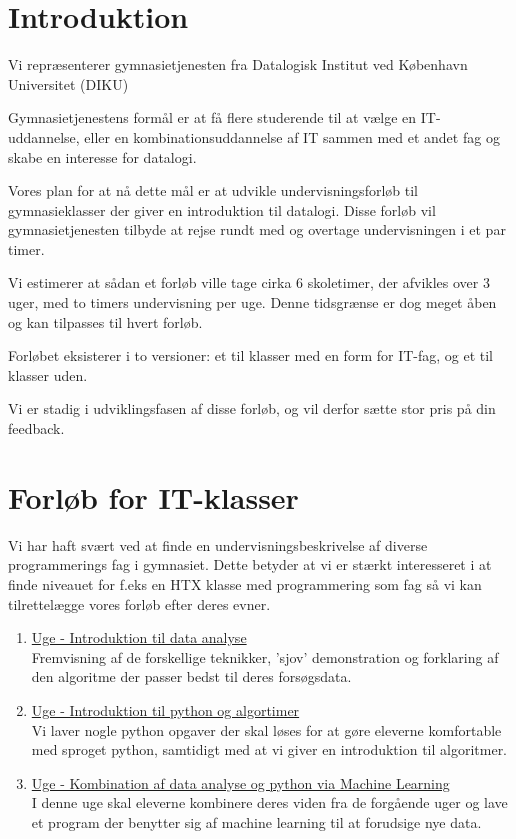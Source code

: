 \documentclass[11pt]{article}
\begin{document}
    \newpage                %
    \setcounter{page}{1}    %
\section{Introduktion}
    Vi repræsenterer gymnasietjenesten fra
    Datalogisk Institut ved København Universitet (DIKU)

    Gymnasietjenestens formål er at få flere studerende til at vælge en
    IT-uddannelse, eller en kombinationsuddannelse af IT sammen med et andet fag
    og skabe en interesse for datalogi.

    Vores plan for at nå dette mål er at udvikle undervisningsforløb til
    gymnasieklasser der giver en introduktion til datalogi. Disse forløb vil
    gymnasietjenesten tilbyde at rejse rundt med og overtage undervisningen i et
    par timer.

    Vi estimerer at sådan et forløb ville tage cirka 6 skoletimer, der afvikles
    over 3 uger, med to timers undervisning per uge. Denne tidsgrænse er dog
    meget åben og kan tilpasses til hvert forløb.

    Forløbet eksisterer i to versioner: et til klasser med en form for IT-fag,
    og et til klasser uden.

    Vi er stadig i udviklingsfasen af disse forløb, og vil derfor sætte stor
    pris på din feedback.

\section{Forløb for IT-klasser}
    Vi har haft svært ved at finde en undervisningsbeskrivelse af diverse
    programmerings fag i gymnasiet. Dette betyder at vi er stærkt interesseret i
    at finde niveauet for f.eks en HTX klasse med programmering som fag så vi
    kan tilrettelægge vores forløb efter deres evner.
    \begin{enumerate}
        \item \underline{Uge - Introduktion til data analyse} ~ \\
        Fremvisning af de forskellige teknikker, 'sjov' demonstration og
        forklaring af den algoritme der passer bedst til deres forsøgsdata.

        \item \underline{Uge - Introduktion til python og algortimer} ~ \\
        Vi laver nogle python opgaver der skal løses for at gøre eleverne
        komfortable med sproget python, samtidigt med at vi giver en
        introduktion til algoritmer.

        \item \underline{Uge - Kombination af data analyse og python via
        Machine Learning} ~ \\
        I denne uge skal eleverne kombinere deres viden fra de forgående uger
        og lave et program der benytter sig af machine learning til at forudsige
        nye data.
    \end{enumerate}
    \vspace{-1em}
\end{document}
